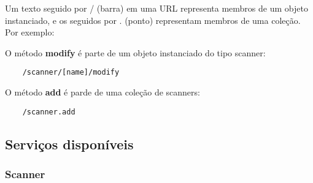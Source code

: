 Um texto seguido por / (barra) em uma URL representa membros de um objeto 
instanciado, e os seguidos por . (ponto) representam membros de uma coleção. 
Por exemplo:

O método {\bf modify} é parte de um objeto instanciado do tipo scanner:
\begin{verbatim}
    /scanner/[name]/modify
\end{verbatim}

O método {\bf add} é parde de uma coleção de scanners:
\begin{verbatim}
    /scanner.add
\end{verbatim}

\subsection{Serviços disponíveis}
\label{sec:servicos_disponiveis}

\subsubsection{Scanner}

